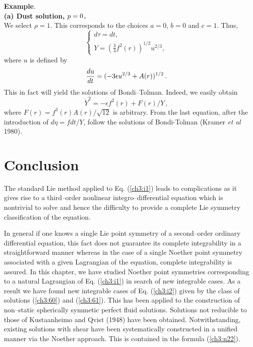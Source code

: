 {{\bf Example}.\\
{\bf (a) Dust solution, ${\boldmath p=0}$.}\\
We select $\rho=1$. This corresponds to the choices $a=0$, $b=0$ and $c=1$.  Thus,
$$
\left \{ \begin{array}{lll}
d\tau= dt,\\ 
Y=\left (\frac{3}{4}f^2(r)\right )^{1/2}u^{2/3}, \end{array} \right.
$$ 
where $u$ is defined by
$$
{du\over dt}=(-3\epsilon u^{2/3}+A(r))^{1/2}\,.
$$
This in fact will yield the solutions of Bondi--Tolman. Indeed, we easily obtain
$$
{\dot Y}^2=-\epsilon f^2(r)+F(r)/Y\,,
$$
where $F(r)=f^3(r)A(r)/\sqrt{12}$ is arbitrary. From the last equation, after the introduction
of $d\eta=f dt/Y$,  follow the solutions of Bondi-Tolman
(Kramer {\em et al} 1980).

\section{Conclusion} 
The standard Lie method applied to Eq. (\ref{ch3:i1}) leads to complications as it gives rise
to a third--order nonlinear integro--differential equation which is nontrivial to solve and
hence the difficulty to provide a complete Lie symmetry classification of the equation. 

In general if one
knows a single Lie point symmetry of a second--order ordinary differential equation, 
this fact does not guarantee its complete integrability in a straightforward
manner whereas in the case of a single Noether point
symmetry associated with a  given Lagrangian of the equation, complete integrability
is assured. In this chapter,  we have
studied Noether point symmetries corresponding to a natural Lagrangian of Eq. (\ref{ch3:i1})  in search of new integrable cases. 
As a result we have found new integrable
cases of Eq. (\ref{ch3:i2}) given by the class of solutions
(\ref{ch3:60}) and (\ref{ch3:61}). This has been applied to the construction of
non--static spherically symmetic perfect fluid solutions. Solutions not
reducible to those of Kustaanheimo and Qvist (1948) have been obtained.
Notwithstanding,
existing solutions with shear have been systematically constructed in a unified manner
via the Noether approach. This is contained in the formula (\ref{ch3:n22}).

%

}
